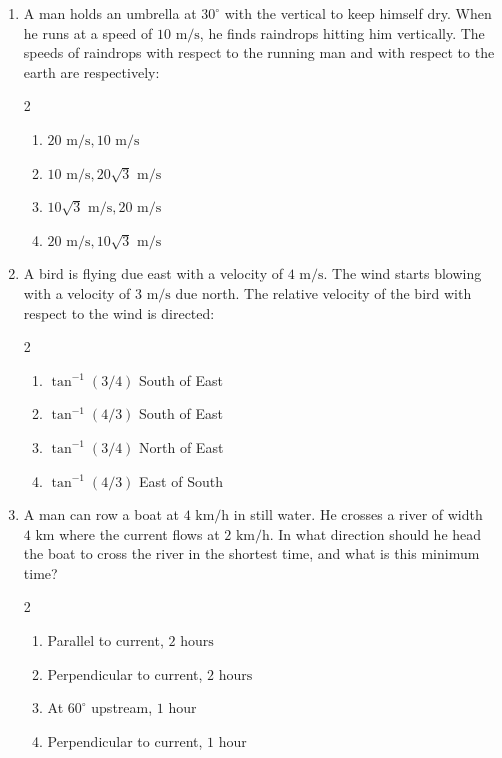 \documentclass[11pt,a4paper]{article}
\begin{document}
\begin{enumerate}[label=\textbf{\textcolor{l2Amber}{Q\arabic*.}},leftmargin=24pt,itemsep=10pt,start=26]

  \item A man holds an umbrella at $30^\circ$ with the vertical to keep himself dry. When he runs at a speed of $10\text{ m/s}$, he finds raindrops hitting him vertically. The speeds of raindrops with respect to the running man and with respect to the earth are respectively:
  \begin{multicols}{2}
  \begin{enumerate}[label=\textbf{\textcolor{primaryDark}{(\Alph*)}},itemsep=2pt]
    \item $20\text{ m/s}, 10\text{ m/s}$
    \item $10\text{ m/s}, 20\sqrt{3}\text{ m/s}$
    \item $10\sqrt{3}\text{ m/s}, 20\text{ m/s}$
    \item $20\text{ m/s}, 10\sqrt{3}\text{ m/s}$
  \end{enumerate}
  \end{multicols}

  \item A bird is flying due east with a velocity of $4\text{ m/s}$. The wind starts blowing with a velocity of $3\text{ m/s}$ due north. The relative velocity of the bird with respect to the wind is directed:
  \begin{multicols}{2}
  \begin{enumerate}[label=\textbf{\textcolor{primaryDark}{(\Alph*)}},itemsep=2pt]
    \item $\tan^{-1}(3/4)$ South of East
    \item $\tan^{-1}(4/3)$ South of East
    \item $\tan^{-1}(3/4)$ North of East
    \item $\tan^{-1}(4/3)$ East of South
  \end{enumerate}
  \end{multicols}

  \item A man can row a boat at $4\text{ km/h}$ in still water. He crosses a river of width $4\text{ km}$ where the current flows at $2\text{ km/h}$. In what direction should he head the boat to cross the river in the shortest time, and what is this minimum time?
  \begin{multicols}{2}
  \begin{enumerate}[label=\textbf{\textcolor{primaryDark}{(\Alph*)}},itemsep=2pt]
    \item Parallel to current, $2\text{ hours}$
    \item Perpendicular to current, $2\text{ hours}$
    \item At $60^\circ$ upstream, $1\text{ hour}$
    \item Perpendicular to current, $1\text{ hour}$
  \end{enumerate}
  \end{multicols}


\end{enumerate}
\end{document}
